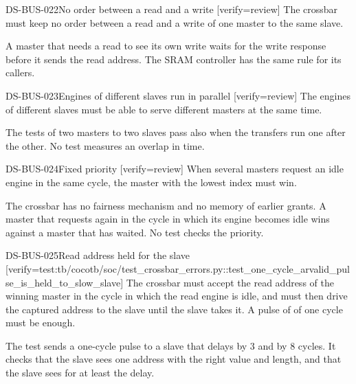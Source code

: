 \begin{requirement}{DS-BUS-022}{No order between a read and a write}
[verify={review}]
The crossbar must keep no order between a read and a write of one master to the same slave.
\end{requirement}
\begin{information}
A master that needs a read to see its own write waits for the write response before it sends the read address. The SRAM controller has the same rule for its callers.
\end{information}

\begin{requirement}{DS-BUS-023}{Engines of different slaves run in parallel}
[verify={review}]
The engines of different slaves must be able to serve different masters at the same time.
\end{requirement}
\begin{information}
The tests of two masters to two slaves pass also when the transfers run one after the other. No test measures an overlap in time.
\end{information}

\begin{requirement}{DS-BUS-024}{Fixed priority}
[verify={review}]
When several masters request an idle engine in the same cycle, the master with the lowest index must win.
\end{requirement}
\begin{information}
The crossbar has no fairness mechanism and no memory of earlier grants. A master that requests again in the cycle in which its engine becomes idle wins against a master that has waited. No test checks the priority.
\end{information}

\begin{requirement}{DS-BUS-025}{Read address held for the slave}
[verify={test:tb/cocotb/soc/test_crossbar_errors.py::test_one_cycle_arvalid_pulse_is_held_to_slow_slave}]
The crossbar must accept the read address of the winning master in the cycle in which the read engine is idle, and must then drive the captured address to the slave until the slave takes it. A pulse of  of one cycle must be enough.
\end{requirement}
\begin{information}
The test sends a one-cycle pulse to a slave that delays  by 3 and by 8 cycles. It checks that the slave sees one address with the right value and length, and that the slave sees  for at least the delay.
\end{information}

